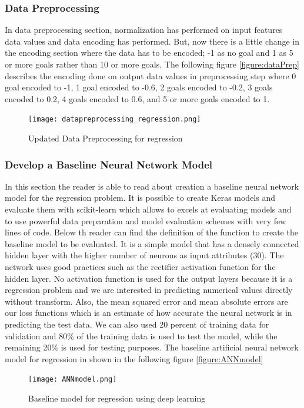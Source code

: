 \subsubsection{Data Preprocessing}
In data preprocessing section, normalization has performed on input features data values and data encoding has performed. But, now there is a little change in the encoding section where the data has to be encoded; -1 as no goal and 1 as 5 or more goals rather than 10 or more goals.\newline
The following figure \autoref{figure:dataPrep} describes the encoding done on output data values in preprocessing step where 0 goal encoded to -1, 1 goal encoded to -0.6, 2 goals encoded to -0.2, 3 goals encoded to 0.2, 4 goals encoded to 0.6, and 5 or more goals encoded to 1.\newline
\begin{figure}[H]
\begin{center}
\texttt{[image: datapreprocessing\_regression.png]}
\end{center}
\caption{Updated Data Preprocessing for regression }
\label{figure:dataPrep}
\end{figure}
\subsubsection{Develop a Baseline Neural Network Model}
In this section the reader is able to read about creation a baseline neural network model for the regression problem. It is possible to create Keras models and evaluate them with scikit-learn which allows to excels at evaluating models and to use powerful data preparation and model evaluation schemes with very few lines of code.\newline
Below th reader can find the definition of the function to create the baseline model to be evaluated. It is a simple model that has a densely connected hidden layer with the higher number of neurons as input attributes (30). The network uses good practices such as the rectifier activation function for the hidden layer. No activation function is used for the output layers because it is a regression problem and we are interested in predicting numerical values directly without transform.\newline
Also, the mean squared error and mean absolute errors are our loss functions which is an estimate of how accurate the neural network is in predicting the test data. We can also used 20 percent of training data for validation and 80\% of the training data is used to test the model, while the remaining 20\% is used for testing purposes.\newline
The baseline artificial neural network model for regression in shown in the following figure \autoref{figure:ANNmodel} \newline
\begin{figure}[H]
\begin{center}
\texttt{[image: ANNmodel.png]}
\end{center}
\caption{Baseline model for regression using deep learning }
\label{figure:ANNmodel}
\end{figure}
